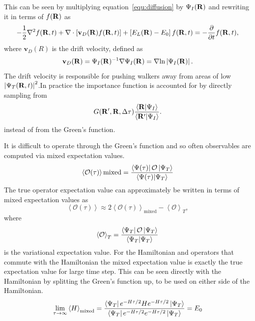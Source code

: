 This can be seen by multiplying equation~\ref{equ:diffusion} by $\Psi_I(\mathbf{R})$ and rewriting it in terms of $f(\mathbf{R})$ as
\begin{equation}
   -\frac{1}{2}\nabla^2 f(\mathbf{R},t) + \nabla\cdot\left[\mathbf{v}_D(\mathbf{R}) f(\mathbf{R},t)\right] + \left[E_L(\mathbf{R})-E_0\right]f(\mathbf{R},t) = -\frac{\partial}{\partial t} f(\mathbf{R},t),
\end{equation}
where $\mathbf{v}_D(R)$ is the drift velocity, defined as
\begin{equation}
   \mathbf{v}_D(\mathbf{R}) = \Psi_I(\mathbf{R})^{-1}\nabla\Psi_I(\mathbf{R}) = \nabla \text{ln}\left|\Psi_I(\mathbf{R})\right|.
\end{equation}
The drift velocity is responsible for pushing walkers away from areas of low $\left|\Psi_T(\mathbf{R},t)\right|^2$.In practice the importance function is accounted for by directly sampling from
\begin{equation}
   G(\mathbf{R}',\mathbf{R},\Delta\tau)\frac{\left< \mathbf{R} | \Psi_I \right>}{\left< \mathbf{R}' | \Psi_I \right>}.
\end{equation}
instead of from the Green's function.

It is difficult to operate through the Green's function and so often observables are computed via mixed expectation values.
\begin{equation}
   \left<\mathcal{O(\tau)}\right>\text{mixed} = \frac{\left< \Psi(\tau) \right|\mathcal{O}\left| \Psi_T \right>}{\left< \Psi(\tau) | \Psi_T \right>}
\end{equation}
The true operator expectation value can approximately be written in terms of mixed expectation values \cite{pudliner1997} as
\begin{equation}
   \left<\mathcal{O(\tau)}\right> \approx 2\left<\mathcal{O(\tau)}\right>_\text{mixed} - \left<\mathcal{O}\right>_T,
\end{equation}
where
\begin{equation}
   \left<\mathcal{O}\right>_T = \frac{\left< \Psi_T \right|\mathcal{O}\left| \Psi_T \right>}{\left< \Psi_T | \Psi_T \right>}
\end{equation}
is the variational expectation value. For the Hamiltonian and operators that commute with the Hamiltonian the mixed expectation value is exactly the true expectation value for large time step. This can be seen directly with the Hamiltonian by splitting the Green's function up, to be used on either side of the Hamiltonian.
\begin{equation}
   \lim\limits_{\tau\rightarrow\infty}\left<H\right>_\text{mixed} = \frac{\left< \Psi_T \right|e^{-H\tau/2}He^{-H\tau/2}\left| \Psi_T \right>}{\left< \Psi_T \right|e^{-H\tau/2}e^{-H\tau/2}\left| \Psi_T \right>} = E_0
\end{equation}

